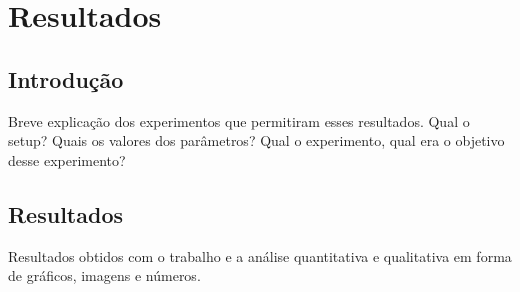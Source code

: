 


\chapter{Resultados\label{chap:Resultados}}



\section{Introdução}

Breve explicação dos experimentos que permitiram esses resultados.
Qual o setup? Quais os valores dos parâmetros? Qual o experimento,
qual era o objetivo desse experimento?


\section{Resultados}

Resultados obtidos com o trabalho e a análise quantitativa e qualitativa
em forma de gráficos, imagens e números.
